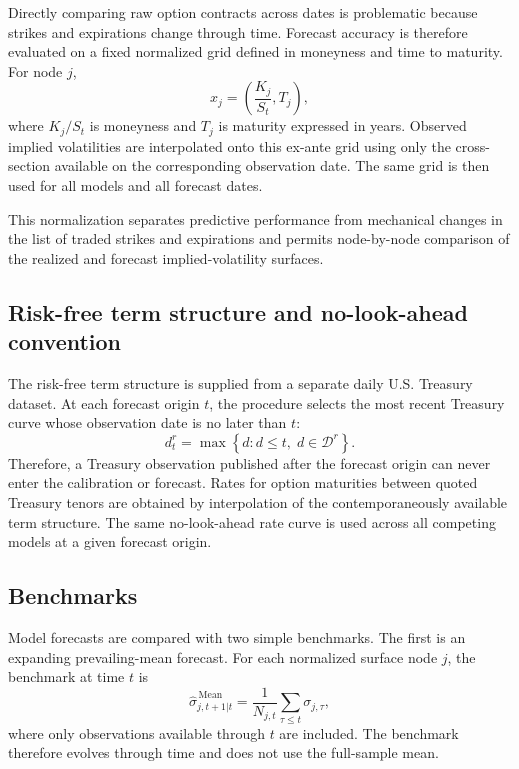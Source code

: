 Directly comparing raw option contracts across dates is problematic because
strikes and expirations change through time.  Forecast accuracy is therefore
evaluated on a fixed normalized grid defined in moneyness and time to maturity.
For node $j$,
\begin{equation}
    x_j =
    \left(
        \frac{K_j}{S_t},
        T_j
    \right),
\end{equation}
where $K_j/S_t$ is moneyness and $T_j$ is maturity expressed in years.
Observed implied volatilities are interpolated onto this ex-ante grid using only
the cross-section available on the corresponding observation date.  The same
grid is then used for all models and all forecast dates.

This normalization separates predictive performance from mechanical changes in
the list of traded strikes and expirations and permits node-by-node comparison
of the realized and forecast implied-volatility surfaces.

\subsection{Risk-free term structure and no-look-ahead convention}
\label{subsec:oos_rates}

The risk-free term structure is supplied from a separate daily U.S. Treasury
dataset.  At each forecast origin $t$, the procedure selects the most recent
Treasury curve whose observation date is no later than $t$:
\begin{equation}
    d_t^{r}
    =
    \max
    \left\{
        d :
        d \leq t,\;
        d \in \mathcal{D}^{r}
    \right\}.
\end{equation}
Therefore, a Treasury observation published after the forecast origin can never
enter the calibration or forecast.  Rates for option maturities between quoted
Treasury tenors are obtained by interpolation of the contemporaneously
available term structure.  The same no-look-ahead rate curve is used across all
competing models at a given forecast origin.

\subsection{Benchmarks}
\label{subsec:oos_benchmarks}

Model forecasts are compared with two simple benchmarks.  The first is an
expanding prevailing-mean forecast.  For each normalized surface node $j$, the
benchmark at time $t$ is
\begin{equation}
    \widehat{\sigma}^{\,\mathrm{Mean}}_{j,t+1|t}
    =
    \frac{1}{N_{j,t}}
    \sum_{\tau \leq t}
    \sigma_{j,\tau},
\end{equation}
where only observations available through $t$ are included.  The benchmark
therefore evolves through time and does not use the full-sample mean.

